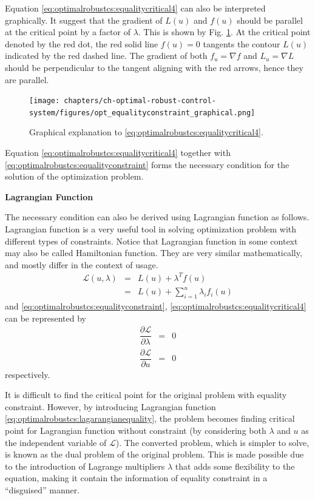 Equation \eqref{eq:optimalrobustcs:equalitycritical4} can also be interpreted graphically. It suggest that the gradient of $L(u)$ and $f(u)$ should be parallel at the critical point by a factor of $\lambda$. This is shown by Fig. \ref{fig:optimalrobustcs:opt_equalityconstraint_graphical}. At the critical point denoted by the red dot, the red solid line $f(u)=0$ tangents the contour $L(u)$ indicated by the red dashed line. The gradient of both $f_u=\nabla f$ and $L_u=\nabla L$ should be perpendicular to the tangent aligning with the red arrows, hence they are parallel.
\begin{figure}
	\centering
	\texttt{[image: chapters/ch-optimal-robust-control-system/figures/opt\_equalityconstraint\_graphical.png]}
	\caption{Graphical explanation to \eqref{eq:optimalrobustcs:equalitycritical4}.} \label{fig:optimalrobustcs:opt_equalityconstraint_graphical}
\end{figure}

Equation \eqref{eq:optimalrobustcs:equalitycritical4} together with \eqref{eq:optimalrobustcs:equalityconstraint} forms the necessary condition for the solution of the optimization problem.

\vspace{0.1in}
\noindent \textbf{Lagrangian Function}
\vspace{0.1in}

The necessary condition can also be derived using Lagrangian function as follows. Lagrangian function is a very useful tool in solving optimization problem with different types of constraints. Notice that Lagrangian function in some context may also be called Hamiltonian function. They are very similar mathematically, and mostly differ in the context of usage.
\begin{eqnarray}
	\mathcal{L}(u, \lambda) &=& L(u) + \lambda^Tf(u) \label{eq:optimalrobustcs:lagarangianequality} \\
	&=& L(u) + \sum_{i=1}^{n}\lambda_if_i(u) \nonumber
\end{eqnarray}
and \eqref{eq:optimalrobustcs:equalityconstraint}, \eqref{eq:optimalrobustcs:equalitycritical4} can be represented by
\begin{eqnarray}
	\dfrac{\partial \mathcal{L}}{\partial \lambda} &=& 0 \nonumber \\
	\dfrac{\partial \mathcal{L}}{\partial u} &=& 0 \nonumber
\end{eqnarray}
respectively.

It is difficult to find the critical point for the original problem with equality constraint. However, by introducing Lagrangian function \eqref{eq:optimalrobustcs:lagarangianequality}, the problem becomes finding critical point for Lagrangian function without constraint (by considering both $\lambda$ and $u$ as the independent variable of $\mathcal{L}$). The converted problem, which is simpler to solve, is known as the dual problem of the original problem. This is made possible due to the introduction of Lagrange multipliers $\lambda$ that adds some flexibility to the equation, making it contain the information of equality constraint in a ``disguised'' manner.

